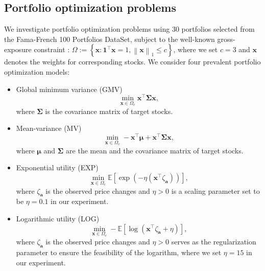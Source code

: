 \documentclass[aos]{imsart}
\numberwithin{equation}{section}
\theoremstyle{plain}
\begin{document}
\subsection{Portfolio optimization problems}
We investigate portfolio optimization problems using $30$ portfolios selected from the Fama-French 100 Portfolios DataSet, subject to the well-known gross-exposure constraint \cite{fan2012vast}:
$\Omega := \left\{\bm{x}: \bm{1}^{\top} \bm{x} = 1, \left\| \bm{x} \right\|_1 \leq c\right\}$,
where we set $c =3$ and $\bm{x}$ denotes the weights for corresponding stocks. We consider four prevalent portfolio optimization models:
\begin{itemize}
        \item Global minimum variance (GMV)
        \begin{equation*}
            \min_{\bm{x} \in \Omega_c} \bm{x}^{\top} \bm{\Sigma} \bm{x},
        \end{equation*}
        where $\bm{\Sigma}$ is the covariance matrix of target stocks.

        \item Mean-variance (MV)
        \begin{equation*}
            \min_{\bm{x} \in \Omega_c}  -\bm{x}^{\top}\bm{\mu} + \bm{x}^{\top} \bm{\Sigma} \bm{x},
        \end{equation*}
        where $\bm{\mu}$ and $\bm{\Sigma}$ are the mean and the covariance matrix of target stocks.

        \item Exponential utility (EXP)
        \begin{equation*}
            \min_{\bm{x} \in \Omega_c} \mathbb{E} \left[ \exp \left(-\eta \left(\bm{x}^{\top} \zeta_{\bm{a}} \right)\right) \right],
        \end{equation*}
        where $\zeta_{\bm{a}}$ is the observed price changes and $\eta>0$ is a scaling parameter set to be $\eta= 0.1$ in our experiment.

        \item Logarithmic utility (LOG) 
        \begin{equation*}
            \min_{\bm{x} \in \Omega_c}  -\mathbb{E} \left[ \log \left( \bm{x}^{\top} \zeta_{\bm{a}}+ \eta \right)  \right],
        \end{equation*}
        where $\zeta_{\bm{a}}$ is the observed price changes and $\eta>0$ serves as the regularization parameter to ensure the feasibility of the logarithm, where we set $\eta=15$ in our experiment.
    \end{itemize}
\end{document}
